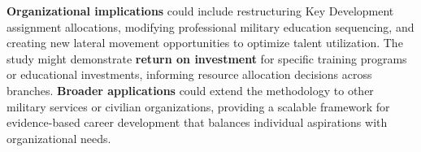 \documentclass[main.tex]{subfiles}
\begin{document}
\textbf{Organizational implications} could include restructuring Key Development assignment allocations, modifying professional military education sequencing, and creating new lateral movement opportunities to optimize talent utilization\parencite{succession_pipelines}. The study might demonstrate \textbf{return on investment} for specific training programs or educational investments, informing resource allocation decisions across branches\parencite{army_indicators}. \textbf{Broader applications} could extend the methodology to other military services or civilian organizations, providing a scalable framework for evidence-based career development that balances individual aspirations with organizational needs\parencite{career_optimization}.

\end{document}
